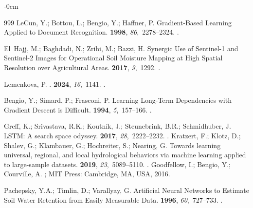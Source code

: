 \documentclass[land,review,accept,pdftex,oneauthor]{Definitions/mdpi}
\begin{document}
\begin{adjustwidth}{-\extralength}{0cm}
\begin{thebibliography}{999}
LeCun, Y.; Bottou, L.; Bengio, Y.; Haffner, P.
\newblock Gradient-Based Learning Applied to Document Recognition.
 {\bf 1998}, {\em 86},~2278--2324.
.

El~Hajj, M.; Baghdadi, N.; Zribi, M.; Bazzi, H.
\newblock Synergic Use of Sentinel-1 and Sentinel-2 Images for Operational Soil
  Moisture Mapping at High Spatial Resolution over Agricultural Areas.
 {\bf 2017}, {\em 9},~1292.
.

Lemenkova, P.
.
 {\bf 2024}, {\em 16},~1141.
.

Bengio, Y.; Simard, P.; Frasconi, P.
\newblock Learning Long-Term Dependencies with Gradient Descent is Difficult.
 {\bf 1994}, {\em
  5},~157--166.
.

Greff, K.; Srivastava, R.K.; Koutn\'ik, J.; Steunebrink, B.R.; Schmidhuber, J.
\newblock LSTM: A search space odyssey.
 {\bf 2017}, {\em 28},~2222--2232.
.
Kratzert, F.; Klotz, D.; Shalev, G.; Klambauer, G.; Hochreiter, S.; Nearing, G.
\newblock Towards learning universal, regional, and local hydrological behaviors via machine learning applied to large-sample datasets.
 {\bf 2019}, {\em 23},~5089--5110.
.
Goodfellow, I.; Bengio, Y.; Courville, A.
; MIT Press: Cambridge, MA, USA,  2016.

Pachepsky, Y.A.; Timlin, D.; Varallyay, G.
\newblock Artificial Neural Networks to Estimate Soil Water Retention from
  Easily Measurable Data.
 {\bf 1996}, {\em
  60},~727--733.
.


\end{thebibliography}
\end{adjustwidth}
\end{document}
